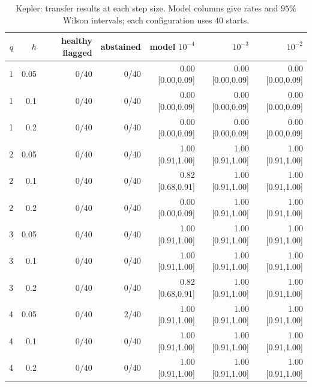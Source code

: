 \begin{table}[ht]
\centering\small
\begin{tabular}{rrrrrrr}
\toprule
$q$ & $h$ & healthy flagged & abstained & model $10^{-4}$ & $10^{-3}$ & $10^{-2}$ \\
\midrule
1 & 0.05 & 0/40 & 0/40 & 0.00 [0.00,0.09] & 0.00 [0.00,0.09] & 0.00 [0.00,0.09] \\
1 & 0.1 & 0/40 & 0/40 & 0.00 [0.00,0.09] & 0.00 [0.00,0.09] & 0.00 [0.00,0.09] \\
1 & 0.2 & 0/40 & 0/40 & 0.00 [0.00,0.09] & 0.00 [0.00,0.09] & 0.00 [0.00,0.09] \\
2 & 0.05 & 0/40 & 0/40 & 1.00 [0.91,1.00] & 1.00 [0.91,1.00] & 1.00 [0.91,1.00] \\
2 & 0.1 & 0/40 & 0/40 & 0.82 [0.68,0.91] & 1.00 [0.91,1.00] & 1.00 [0.91,1.00] \\
2 & 0.2 & 0/40 & 0/40 & 0.00 [0.00,0.09] & 1.00 [0.91,1.00] & 1.00 [0.91,1.00] \\
3 & 0.05 & 0/40 & 0/40 & 1.00 [0.91,1.00] & 1.00 [0.91,1.00] & 1.00 [0.91,1.00] \\
3 & 0.1 & 0/40 & 0/40 & 1.00 [0.91,1.00] & 1.00 [0.91,1.00] & 1.00 [0.91,1.00] \\
3 & 0.2 & 0/40 & 0/40 & 0.82 [0.68,0.91] & 1.00 [0.91,1.00] & 1.00 [0.91,1.00] \\
4 & 0.05 & 0/40 & 2/40 & 1.00 [0.91,1.00] & 1.00 [0.91,1.00] & 1.00 [0.91,1.00] \\
4 & 0.1 & 0/40 & 0/40 & 1.00 [0.91,1.00] & 1.00 [0.91,1.00] & 1.00 [0.91,1.00] \\
4 & 0.2 & 0/40 & 0/40 & 1.00 [0.91,1.00] & 1.00 [0.91,1.00] & 1.00 [0.91,1.00] \\
\bottomrule
\end{tabular}
\caption{Kepler: transfer results at each step size. Model columns give rates and $95\%$ Wilson intervals; each configuration uses $40$ starts.}
\end{table}
